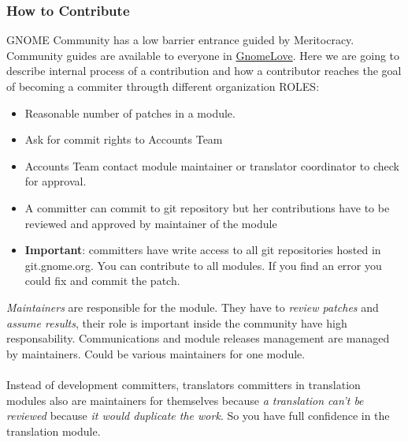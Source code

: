 \subsubsection{ How to Contribute} GNOME Community has a low barrier entrance guided by Meritocracy. Community guides are available to everyone in \href{https://live.gnome.org/GnomeLove}{GnomeLove}. Here we are going to describe internal process of a contribution and how a contributor reaches the goal of becoming a commiter througth different organization ROLES:
\\
\begin{itemize}
	\item Reasonable number of patches in a module.
	\item Ask for commit rights to Accounts Team
	\item Accounts Team contact module maintainer or translator coordinator to check for approval.
	\item A committer can commit to git repository but her contributions have to be reviewed and approved by maintainer of the module
	\item \textbf{Important}: committers have write access to all git repositories hosted in git.gnome.org. You can contribute to all modules. If you find an error you could fix and commit the patch.
\end{itemize}\textit{Maintainers} are responsible for the module. They have to \textit{review patches} and \textit{assume results}, their role is important inside the community have high responsability. Communications and module releases management are managed by maintainers. Could be various maintainers for one module.
\\
\\ Instead of development committers, translators committers in translation modules also are maintainers for themselves because \textit{a translation can't be reviewed} because \textit{it would duplicate the work}. So you have full confidence in the translation module.
\\

